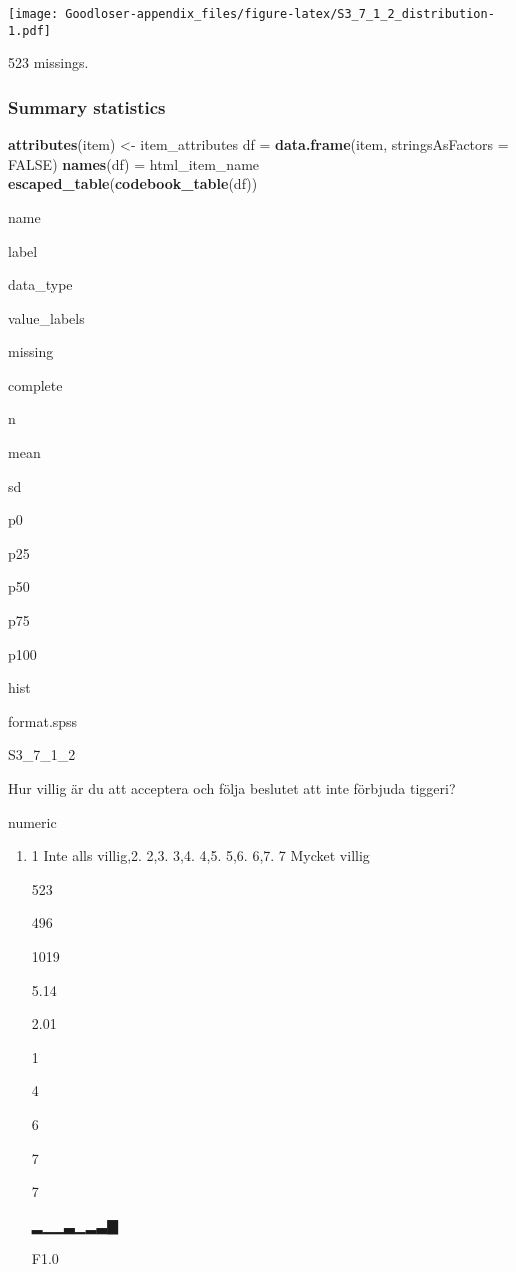 \documentclass[]{book}
\newenvironment{Shaded}{\begin{snugshade}}{\end{snugshade}}
\newcommand{\KeywordTok}[1]{\textcolor[rgb]{0.13,0.29,0.53}{\textbf{#1}}}
\newcommand{\DataTypeTok}[1]{\textcolor[rgb]{0.13,0.29,0.53}{#1}}
\newcommand{\StringTok}[1]{\textcolor[rgb]{0.31,0.60,0.02}{#1}}
\newcommand{\OtherTok}[1]{\textcolor[rgb]{0.56,0.35,0.01}{#1}}
\newcommand{\OperatorTok}[1]{\textcolor[rgb]{0.81,0.36,0.00}{\textbf{#1}}}
\newcommand{\NormalTok}[1]{#1}
\providecommand{\tightlist}{%
  \setlength{\itemsep}{0pt}\setlength{\parskip}{0pt}}
\begin{document}
\texttt{[image: Goodloser-appendix\_files/figure-latex/S3\_7\_1\_2\_distribution-1.pdf]}

\begin{Shaded}
\end{Shaded}

523 missings.

\subsubsection{Summary statistics}\label{S3_7_1_2_summary}

\begin{Shaded}
\begin{Highlighting}[]
\KeywordTok{attributes}\NormalTok{(item) <-}\StringTok{ }\NormalTok{item_attributes}
\NormalTok{df =}\StringTok{ }\KeywordTok{data.frame}\NormalTok{(item, }\DataTypeTok{stringsAsFactors =} \OtherTok{FALSE}\NormalTok{)}
\KeywordTok{names}\NormalTok{(df) =}\StringTok{ }\NormalTok{html_item_name}
\KeywordTok{escaped_table}\NormalTok{(}\KeywordTok{codebook_table}\NormalTok{(df))}
\end{Highlighting}
\end{Shaded}

name

label

data\_type

value\_labels

missing

complete

n

mean

sd

p0

p25

p50

p75

p100

hist

format.spss

S3\_7\_1\_2

Hur villig är du att acceptera och följa beslutet att inte förbjuda
tiggeri?

numeric

\begin{enumerate}
\def\labelenumi{\arabic{enumi}.}
\tightlist
\item
  1 Inte alls villig,2. 2,3. 3,4. 4,5. 5,6. 6,7. 7 Mycket villig

  523

  496

  1019

  5.14

  2.01

  1

  4

  6

  7

  7

  ▂▁▁▃▁▂▃▇

  F1.0
\end{enumerate}
\end{document}
